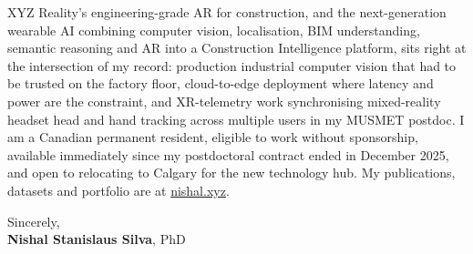 \documentclass[11pt]{article}
\newcommand{\clName}{Nishal Stanislaus Silva}
\newcommand{\clSite}{https://nishal.xyz}
\begin{document}
XYZ Reality's engineering-grade AR for construction, and the next-generation wearable AI combining computer vision, localisation, BIM understanding, semantic reasoning and AR into a Construction Intelligence platform, sits right at the intersection of my record: production industrial computer vision that had to be trusted on the factory floor, cloud-to-edge deployment where latency and power are the constraint, and XR-telemetry work synchronising mixed-reality headset head and hand tracking across multiple users in my MUSMET postdoc. I am a Canadian permanent resident, eligible to work without sponsorship, available immediately since my postdoctoral contract ended in December 2025, and open to relocating to Calgary for the new technology hub. My publications, datasets and portfolio are at \href{\clSite}{nishal.xyz}.

\vspace{10pt}
Sincerely,\\[2pt]
\textbf{\clName}, PhD
\end{document}
